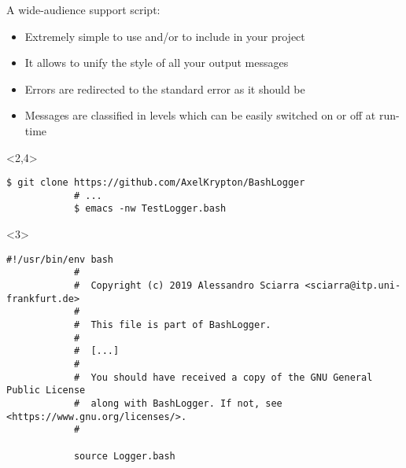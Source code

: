 \begin{frame}[fragile]{A wide-audience support script: }
    \vspace{-3mm}
    \begin{itemize}[<only@1-2,4->]
        \item Extremely simple to use and/or to include in your project
        \item It allows to unify the style of all your output messages
        \item Errors are redirected to the standard error as it should be
        \item Messages are classified in levels which can be easily switched on or off at run-time
    \end{itemize}
    \begin{onlyenv}<2,4>
        \begin{lstlisting}[style=myBash, aboveskip=3mm]
            $ git clone https://github.com/AxelKrypton/BashLogger
            # ...
            $ emacs -nw TestLogger.bash
        \end{lstlisting}
    \end{onlyenv}
    \begin{onlyenv}<3>
        \vspace{3mm}
        \begin{lstlisting}[style=myBash, numbers=none, style=smaller]
            #!/usr/bin/env bash
            #
            #  Copyright (c) 2019 Alessandro Sciarra <sciarra@itp.uni-frankfurt.de>
            #
            #  This file is part of BashLogger.
            #
            #  [...]
            #
            #  You should have received a copy of the GNU General Public License
            #  along with BashLogger. If not, see <https://www.gnu.org/licenses/>.
            #
            
            source Logger.bash
            

\end{lstlisting}
\end{onlyenv}
\end{frame}
